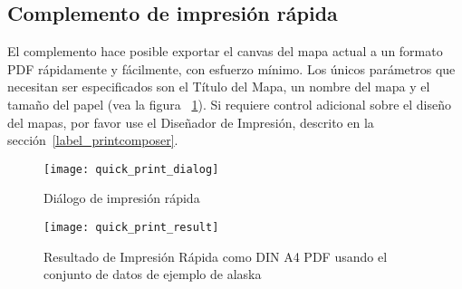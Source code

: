 
\subsection{Complemento de impresión rápida}


El complemento  hace posible exportar el canvas del mapa actual a un formato PDF rápidamente y fácilmente, con esfuerzo mínimo. Los únicos parámetros que necesitan ser especificados son el Título del Mapa, un nombre del mapa y el tamaño del papel (vea la figura ~\ref{fig:quickprint}). 
Si requiere control adicional sobre el diseño del mapas, 
por favor use el Diseñador de Impresión, descrito en la sección~\ref{label_printcomposer}.  

\begin{figure}[ht]
   \begin{center}
   \caption{Diálogo de impresión rápida \nixcaption}\label{fig:quickprint}\smallskip
   \texttt{[image: quick\_print\_dialog]}
\end{center}
\end{figure}

\begin{figure}[ht]
   \begin{center}
   \caption{Resultado de Impresión Rápida como DIN A4 PDF usando el conjunto de datos de ejemplo de alaska \nixcaption}\label{fig:quickprint_result}\smallskip
   \texttt{[image: quick\_print\_result]}
\end{center}
\end{figure}
